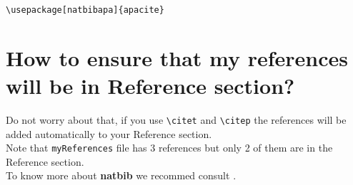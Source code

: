 \documentclass[10pt]{article}
\begin{document}
\begin{verbatim}
\usepackage[natbibapa]{apacite}

\end{verbatim}

\section{How to ensure that my references will be in Reference section?}
Do not worry about that, if you use \verb|\citet| and \verb|\citep| the references will be added automatically to your Reference section.\\

Note that \verb|myReferences| file has 3 references but only 2 of them are in the Reference section.\\

To know more about \textbf{natbib} we recommed consult \citet{natbib}.


\end{document}
